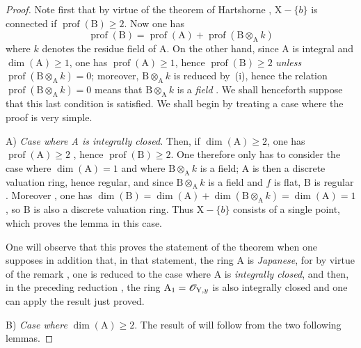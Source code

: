 \begin{proof}
Note first that by virtue of the theorem of Hartshorne , $\mathrm{X}-\{b\}$ is connected if $\operatorname{prof}(\mathrm{B})\geq 2$.
Now one has 
\begin{equation}
  \operatorname{prof}(\mathrm{B})=\operatorname{prof}(\mathrm{A})+\operatorname{prof}(\mathrm{B}\otimes_{\mathrm{A}}k)
  \label{IV.18.9.7.4}
\tag{18.9.7.4}
\end{equation}
where $k$ denotes the residue field of A.
On the other hand, since A is integral and $\dim(\mathrm{A})\geq 1$, one has $\operatorname{prof}(\mathrm{A})\geq 1$, hence $\operatorname{prof}(\mathrm{B})\geq 2$ \emph{unless} $\operatorname{prof}(\mathrm{B}\otimes_{\mathrm{A}}k)=0$;
moreover, $\mathrm{B}\otimes_{\mathrm{A}}k$ is reduced by~(i), hence the relation $\operatorname{prof}(\mathrm{B}\otimes_{\mathrm{A}}k)=0$ means that $\mathrm{B}\otimes_{\mathrm{A}}k$ is a \emph{field} .
We shall henceforth suppose that this last condition is satisfied.
We shall begin by treating a case where the proof is very simple.

A) \emph{Case where A is integrally closed.}
Then, if $\dim(\mathrm{A})\geq 2$, one has $\operatorname{prof}(\mathrm{A})\geq 2$ , hence $\operatorname{prof}(\mathrm{B})\geq 2$.
One therefore only has to consider the case where $\dim(\mathrm{A})=1$ and where $\mathrm{B}\otimes_{\mathrm{A}}k$ is a field;
A is then a discrete valuation ring, hence regular, and since $\mathrm{B}\otimes_{\mathrm{A}}k$
is a field and $f$ is flat, B is regular .
Moreover , one has $\dim(\mathrm{B})=\dim(\mathrm{A})+\dim(\mathrm{B}\otimes_{\mathrm{A}}k)=\dim(\mathrm{A})=1$, so B is also a discrete valuation ring.
Thus $\mathrm{X}-\{b\}$ consists of a single point, which proves the lemma  in this case.

One will observe that this proves the statement of the theorem  when one supposes in addition that, in that statement, the ring A is \emph{Japanese}, for by virtue of the remark , one is reduced to the case where A is \emph{integrally closed}, and then, in the preceding reduction , the ring $\mathrm{A}_1=\mathscr{O}_{\mathrm{Y},y}$ is also integrally closed and one can apply the result just proved.

B) \emph{Case where} $\dim(\mathrm{A})\geq 2$.
The result of  will follow from the two following lemmas.
\end{proof}

